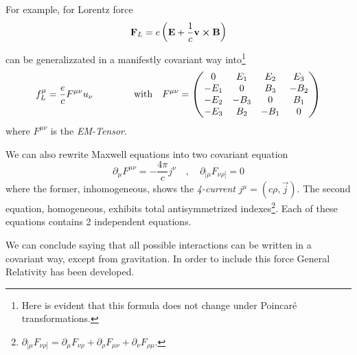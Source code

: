 \documentclass[../main/main.tex]{subfiles}
\begin{document}
For example, for Lorentz force
\[\mathbf F_L=e\left(\mathbf E+\frac1c\mathbf v\cross\mathbf B\right)\]
can be generalizzated in a manifestly covariant way into\footnote{Here is evident that this formula does not change under Poincaré transformations.}
\[f^\mu_L=\frac ecF^{\mu\nu}u_\nu\hspace{1.5cm}\text{with}\quad F^{\mu\nu}=
\begin{pmatrix}0&E_1&E_2&E_3\\-E_1&0&B_3&-B_2\\-E_2&-B_3&0&B_1\\-E_3&B_2&-B_1&0\end{pmatrix}\]
where $F^{\mu\nu}$ is the \emph{EM-Tensor}.

We can also rewrite Maxwell equations into two covariant equation
\[\partial_\mu F^{\mu\nu}=-\frac{4\pi}{c}j^\nu\quad,\quad\partial_{[\mu}F_{\nu\rho]}=0\]
where the former, inhomogeneous, shows the \emph{4-current} $j^\mu=(c\rho, \vec j)$. The second equation, homogeneous, exhibits total antisymmetrized indexes\footnote{$\partial_{[\mu}F_{\nu\rho]}=\partial_{\mu}F_{\nu\rho}+\partial_\rho F_{\mu\nu}+\partial_\nu F_{\rho\mu}$.}. Each of these equations contains 2 independent equations.


We can conclude saying that all possible interactions can be written in a covariant way, except from gravitation. In order to include this force General Relativity has been developed.
\end{document}
